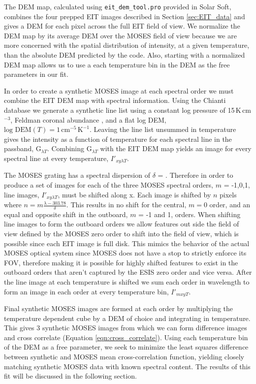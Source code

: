 		
		The DEM map, calculated using \texttt{eit\_dem\_tool.pro} provided in Solar Soft, combines the four prepped EIT images described in Section \ref{sec:EIT_data} and gives a DEM for each pixel across the full EIT field of view.
		We normalize the DEM map by its average DEM over the MOSES field of view because we are more concerned with the spatial distribution of intensity, at a given temperature, than the absolute DEM predicted by the code.
		Also, starting with a normalized DEM map allows us to use a each temperature bin in the DEM as the free parameters in our fit.

		In order to create a synthetic MOSES image at each spectral order we must combine the EIT DEM map with spectral information.
		Using the Chianti database we generate a synthetic line list using a constant log pressure of 15\,K\,cm$^{-3}$, Feldman coronal abundance \citep{FeldmanAbund}, and a flat log DEM, $\text{log DEM}(T) = 1\,\text{cm}^{-5}\,\text{K}^{-1}$.
		Leaving the line list unsummed in temperature gives the intensity as a function of temperature for each spectral line in the passband, G$_{\lambda T}$.
		Combining G$_{\lambda T}$ with the EIT DEM map yields an image for every spectral line at every temperature, $I'_{xy\lambda T}$.
		
		The MOSES grating has a spectral dispersion of $\delta$ = \spectdisperspix.
		Therefore in order to produce a set of images for each of the three MOSES spectral orders, $m$ = -1,0,1, line images, $I'_{xy\lambda T}$, must be shifted along x.
		Each image is shifted by $n$ pixels where $n = m\frac{\lambda - 303.78}{\delta}$.
		This results in no shift for the central, $m = 0$ order, and an equal and opposite shift in the outboard, $m$ = -1 and 1, orders.
		When shifting line images to form the outboard orders we allow features out side the field of view defined by the MOSES zero order to shift into the field of view, which is possible since each EIT image is full disk.
		This mimics the behavior of the actual MOSES optical system since MOSES does not have a stop to strictly enforce its FOV, therefore making it is possible for highly shifted features to exist in the outboard orders that aren't captured by the ESIS zero order and vice versa.
		After the line image at each temperature is shifted we sum each order in wavelength to form an image in each order at every temperature bin, $I'_{mxyT}$.
		     	
		Final synthetic MOSES images are formed at each order by multiplying the temperature dependent cube by a DEM of choice and integrating in temperature.
		This gives 3 synthetic MOSES images from which we can form difference images and cross correlate (Equation \ref{eqn:cross_correlate}).
		Using each temperature bin of the DEM as a free parameter, we seek to minimize the least squares difference between synthetic and MOSES mean cross-correlation function, yielding closely matching synthetic MOSES data with known spectral content.
		The results of this fit will be discussed in the following section.
		
